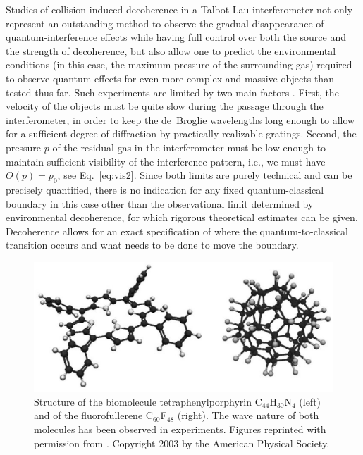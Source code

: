 \documentclass[twocolumn,aps,floatfix,amsmath,amssymb,showpacs,nofootinbib]{revtex4}
\begin{document}
Studies of collision-induced decoherence in a Talbot-Lau
interferometer not only represent an outstanding method to observe the
gradual disappearance of quantum-interference effects while having
full control over both the source and the strength of decoherence, but
also allow one to predict the environmental conditions (in this case,
the maximum pressure of the surrounding gas) required to observe
quantum effects for even more complex and massive objects than tested
thus far. Such experiments are limited by two main factors
\cite{Hornberger:2003:tv,Hackermuller:2003:uu}. First, the velocity of
the objects must be quite slow during the passage through the
interferometer, in order to keep the de~Broglie wavelengths long
enough to allow for a sufficient degree of diffraction by practically
realizable gratings. Second, the pressure $p$ of the residual gas in
the interferometer must be low enough to maintain sufficient
visibility of the interference pattern, i.e., we must have $O(p) =
p_0$, see Eq.~\eqref{eq:vis2}.  Since both limits are purely technical
and can be precisely quantified, there is no indication for any fixed
quantum-classical boundary in this case other than the observational
limit determined by environmental decoherence, for which rigorous
theoretical estimates can be given. Decoherence allows for an exact
specification of where the quantum-to-classical transition occurs and
what needs to be done to move the boundary.

\begin{figure}
\begin{center}
  \includegraphics[scale=.43]{biomol-n.eps}
\end{center}
\caption[Structure of the biomolecule
tetraphenylporphyrin C$_{44}$H$_{30}$N$_4$ and of the fluorofullerene
C$_{60}$F$_{48}$]{\label{fig:biomol} Structure of the biomolecule
  tetraphenylporphyrin C$_{44}$H$_{30}$N$_4$ (left) and of the
  fluorofullerene C$_{60}$F$_{48}$ (right). The wave nature of both
  molecules has been observed in experiments.  Figures reprinted with
  permission from \cite{Hackermueller:2002:wb}.  Copyright 2003
  by the American Physical Society.}
\end{figure}
\end{document}
